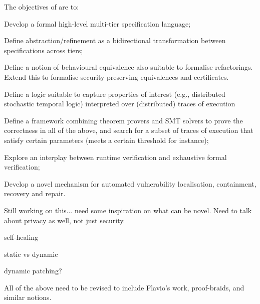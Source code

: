 \addtocounter{wpno}{1}
\begin{Workpackage}{\thewpno}
\WPTitle{\wpname{\thewpno}}


\begin{WPObjectives}
The objectives of \theWP{} are to:
\begin{compactitem}
\item Develop a formal high-level multi-tier specification language; %
\item Define abstraction/refinement as a bidirectional transformation between specifications across tiers;
\item Define a notion of behavioural equivalence also suitable to formalise refactorings. Extend this to formalise security-preserving equivalences and certificates.
\item Define a logic suitable to capture 
properties of interest (e.g., distributed stochastic temporal logic) interpreted over (distributed) traces of execution 
\item Define a framework combining theorem provers and SMT solvers to prove the correctness in all of the above, and search for a subset of traces of execution that satisfy certain parameters (meets a certain threshold for instance);
\item Explore an interplay between runtime verification and exhaustive formal verification;
\item Develop a novel mechanism for automated 
vulnerability localisation, containment, recovery and repair.

\end{compactitem}

\vspace*{1cm}

Still working on this... need some inspiration on what can be novel.
Need to talk about privacy as well, not just security.

self-healing

static vs dynamic

dynamic patching?

All of the above need to be revised to include Flavio's work, proof-braids, and similar notions.


\end{WPObjectives}
\end{Workpackage}
